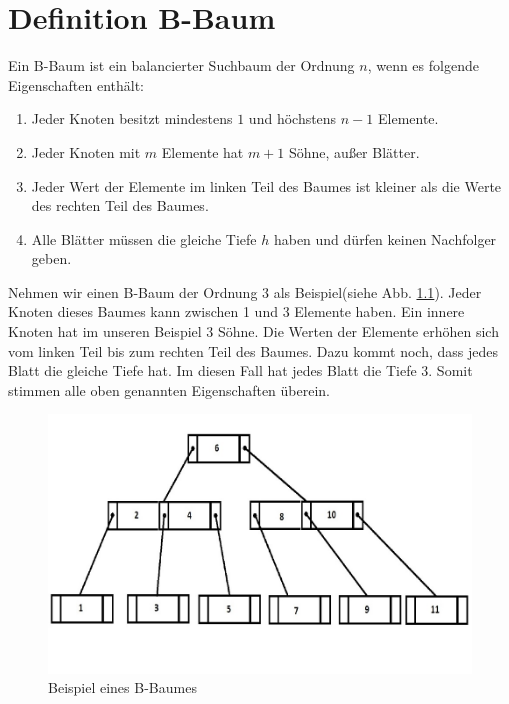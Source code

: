 \chapter{Definition B-Baum}

Ein B-Baum ist ein balancierter Suchbaum der Ordnung $n$, wenn es folgende Eigenschaften enth\"alt:

	\begin{enumerate}
		\item Jeder Knoten besitzt mindestens $1$ und h\"ochstens $n-1$ Elemente.
		\item Jeder Knoten mit $m$ Elemente hat $m+1$ S\"ohne, au\ss er Bl\"atter.
		\item Jeder Wert der Elemente im linken Teil des Baumes ist kleiner als die Werte des rechten Teil des Baumes.
		\item Alle Bl\"atter m\"ussen die gleiche Tiefe $h$ haben und d\"urfen keinen Nachfolger geben.
	\end{enumerate}
Nehmen wir einen B-Baum der Ordnung $3$ als Beispiel(siehe Abb. \ref{d1}). Jeder Knoten dieses Baumes kann zwischen 1 und 3 Elemente haben. Ein innere Knoten hat im unseren Beispiel 3 S\"ohne. Die Werten der Elemente erh\"ohen sich vom linken Teil bis zum rechten Teil des Baumes. Dazu kommt noch, dass jedes Blatt die gleiche Tiefe hat. Im diesen Fall hat jedes Blatt die Tiefe $3$.
Somit stimmen alle oben genannten Eigenschaften \"uberein.
\begin{figure}[h!] %
	\centering
		\includegraphics[scale=0.5]{images/definition.jpg}
	\caption{Beispiel eines B-Baumes}
	\label{d1}
\end{figure}

